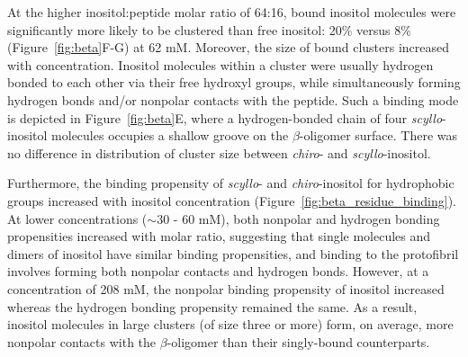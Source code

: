 At the higher inositol:peptide molar ratio of 64:16, bound inositol molecules were significantly more likely to be clustered than free inositol: 20\% versus 8\% (Figure~{\ref{fig:beta}}F-G) at 62 mM. Moreover, the size of bound clusters increased with concentration. Inositol molecules within a cluster were usually hydrogen bonded 
to each other via their free hydroxyl groups, while simultaneously forming hydrogen bonds and/or nonpolar contacts with the peptide.  Such a binding mode is depicted in Figure~{\ref{fig:beta}}E, where a hydrogen-bonded chain of four  \emph{scyllo}-inositol molecules occupies a shallow groove on the $\beta$-oligomer surface. %
There was no difference in distribution of cluster size between \emph{chiro}- and \emph{scyllo}-inositol.

Furthermore, the binding propensity of \emph{scyllo}- and \emph{chiro}-inositol for hydrophobic groups increased with inositol concentration (Figure~\ref{fig:beta_residue_binding}).  At lower concentrations ($\sim$30 - 60 mM), both nonpolar and hydrogen bonding propensities increased with molar ratio, suggesting that single molecules and dimers of inositol have similar binding propensities, and binding to the protofibril involves forming both nonpolar contacts and hydrogen bonds.  However, at a concentration of 208 mM, the nonpolar binding propensity of inositol increased whereas the hydrogen bonding propensity remained the same.  As a result, inositol molecules in large clusters (of size three or more) form, on average, more nonpolar contacts with the $\beta$-oligomer than their singly-bound counterparts.



